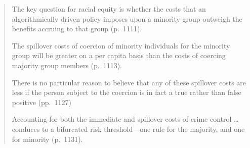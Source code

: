 \documentclass{tufte-handout}
\begin{document}
\begin{itemize}
\begin{quote}
The key question for racial equity is whether the costs that an algorithmically driven policy imposes upon a minority group outweigh the benefits accruing to that group (p.\ 1111).

The spillover costs of coercion of minority individuals for the minority group will be greater on a per capita basis than the costs of coercing majority group members (p.\ 1113).

There is no particular reason to believe that any of these spillover costs are less if the person subject to the coercion is in fact a true rather than false positive (pp.\ 1127) 

Accounting for both the immediate and spillover costs of crime control %
\dots conduces to a bifurcated risk threshold---one rule for the majority, and one for minority (p.\ 1131).
\end{quote}

\end{itemize}
\end{document}
